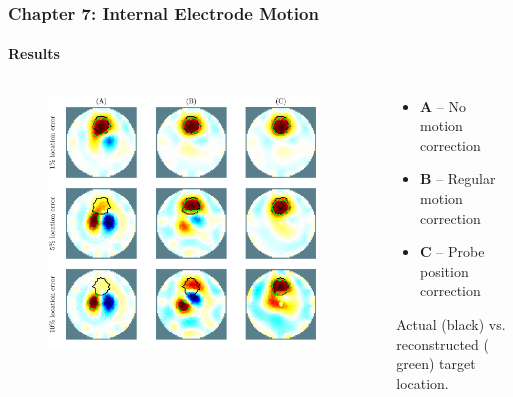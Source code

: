 \documentclass[10pt,    %
    english,            %
    xcolor=table,       %
    envcountsect,        %
    aspectratio=1610
]{beamer}
\begin{document}
\begin{frame}
	\frametitle{Chapter 7: Internal Electrode Motion}
	\framesubtitle{Results}
	\begin{columns}[c]
		\begin{column}{0.65\textwidth}
			\begin{figure}[H]
				\centering
				\includegraphics[width=0.95\textwidth,trim={0cm 0.6cm 0 0cm},clip]{recon_accuracy_hollow_loc_10.pdf}
			\end{figure}
		\end{column}
		\begin{column}{0.35\textwidth}
			\begin{itemize}
				\item \alert{\textbf{A}} -- No motion correction
				\vspace{4mm}
				\item \alert{\textbf{B}} -- Regular motion correction
				\vspace{4mm}
				\item \alert{\textbf{C}} -- Probe position correction
			\end{itemize}
			\vspace{10mm}
			Actual (black) vs. reconstructed ({\color{green} green}) target location.
		\end{column}
	\end{columns}
\end{frame}
\end{document}
